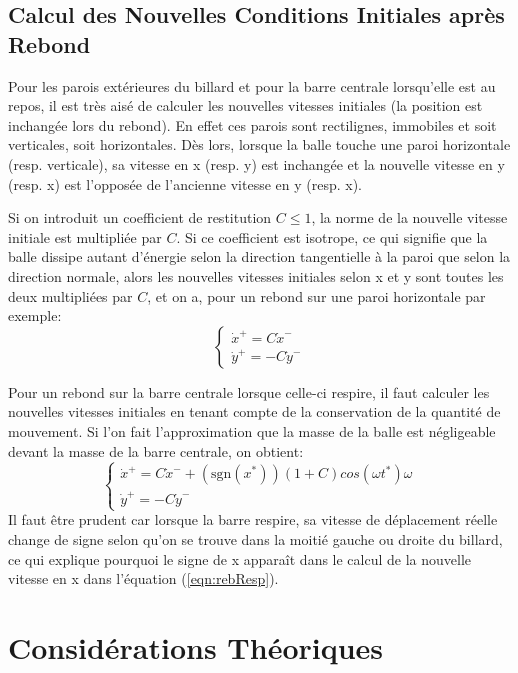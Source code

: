 \documentclass[a4paper]{report}
\begin{document}
\subsection{Calcul des Nouvelles Conditions Initiales après Rebond}
\label{sec:reb}
Pour les parois extérieures du billard et pour la barre centrale lorsqu'elle est au repos, il est très aisé de calculer les nouvelles vitesses initiales (la position est inchangée lors du rebond). En effet ces parois sont rectilignes, immobiles et soit verticales, soit horizontales. Dès lors, lorsque la balle touche une paroi horizontale (resp. verticale), sa vitesse en x (resp. y) est inchangée et la nouvelle vitesse en y (resp. x) est l'opposée de l'ancienne vitesse en y (resp. x).

Si on introduit un coefficient de restitution \(C \leq 1 \), la norme de la nouvelle vitesse initiale est multipliée par \(C\). Si ce coefficient est isotrope, ce qui signifie que la balle dissipe autant d'énergie selon la direction tangentielle à la paroi que selon la direction normale, alors les nouvelles vitesses initiales selon x et y sont toutes les deux multipliées par \(C\), et on a, pour un rebond sur une paroi horizontale par exemple:
\begin{equation}
\label{eqn:rebNoResp}
\begin{cases}
\dot{x}^+=C \dot{x}^-\\
\dot{y}^+=-C \dot{y}^-
\end{cases}
\end{equation}

Pour un rebond sur la barre centrale lorsque celle-ci respire, il faut calculer les nouvelles vitesses initiales en tenant compte de la conservation de la quantité de mouvement. Si l'on fait l'approximation que la masse de la balle est négligeable devant la masse de la barre centrale, on obtient:
\begin{equation}
\label{eqn:rebResp}
\begin{cases}
\dot{x}^+=C\dot{x}^- +  (\text{sgn}(x^*))(1+C)cos(\omega t^*)\omega\\
\dot{y}^+=-C \dot{y}^-
\end{cases}
\end{equation}
Il faut être prudent car lorsque la barre respire, sa vitesse de déplacement réelle change de signe selon qu'on se trouve dans la moitié gauche ou droite du billard, ce qui explique pourquoi le signe de x apparaît dans le calcul de la nouvelle vitesse en x dans l'équation (\ref{eqn:rebResp}).

\section{Considérations Théoriques}
\end{document}
